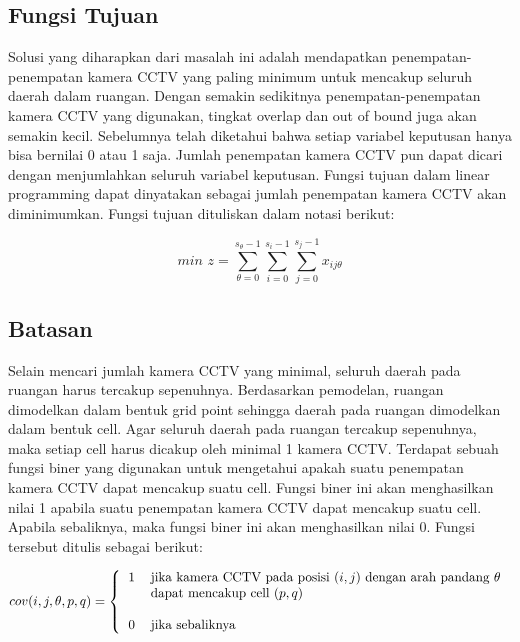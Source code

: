 \subsection{Fungsi Tujuan}
Solusi yang diharapkan dari masalah ini adalah mendapatkan penempatan-penempatan kamera CCTV yang paling minimum untuk mencakup seluruh daerah dalam ruangan. Dengan semakin sedikitnya penempatan-penempatan kamera CCTV yang digunakan, tingkat overlap dan out of bound juga akan semakin kecil. Sebelumnya telah diketahui bahwa setiap variabel keputusan hanya bisa bernilai 0 atau 1 saja. Jumlah penempatan kamera CCTV pun dapat dicari dengan menjumlahkan seluruh variabel keputusan. Fungsi tujuan dalam linear programming dapat dinyatakan sebagai jumlah penempatan kamera CCTV akan diminimumkan. Fungsi tujuan dituliskan dalam notasi berikut:

\begin{equation*}
	\textit{min }z = \sum_{\theta=0}^{s_{\theta}-1} \sum_{i=0}^{s_i-1} \sum_{j=0}^{s_j-1} x_{ij\theta}
\end{equation*}

\subsection{Batasan}
Selain mencari jumlah kamera CCTV yang minimal, seluruh daerah pada ruangan harus tercakup sepenuhnya. Berdasarkan pemodelan, ruangan dimodelkan dalam bentuk grid point sehingga daerah pada ruangan dimodelkan dalam bentuk cell. Agar seluruh daerah pada ruangan tercakup sepenuhnya, maka setiap cell harus dicakup oleh minimal 1 kamera CCTV. Terdapat sebuah fungsi biner yang digunakan untuk mengetahui apakah suatu penempatan kamera CCTV dapat mencakup suatu cell. Fungsi biner ini akan menghasilkan nilai 1 apabila suatu penempatan kamera CCTV dapat mencakup suatu cell. Apabila sebaliknya, maka fungsi biner ini akan menghasilkan nilai 0. Fungsi tersebut ditulis sebagai berikut:

\begin{equation*}
	cov(i,j,\theta,p,q) =
	\left \{
		\begin{tabular}{cl}
			1 & jika kamera CCTV pada posisi $(i,j)$ dengan arah pandang $\theta$\\
  			  & dapat mencakup cell $(p,q)$\\
  			  & \\
  			0 & jika sebaliknya
		\end{tabular}
	\right.
\end{equation*}

